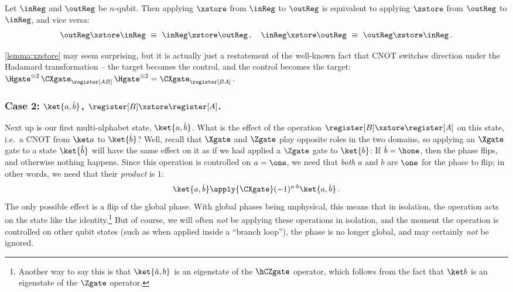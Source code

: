       \begin{lemma}\label{lemma:xzstore}
        Let $\inReg$ and $\outReg$ be $n$-qubit. Then
        applying $\xstore$ from $\inReg$ to $\outReg$ is equivalent to applying
        $\zstore$ from $\outReg$ to $\inReg$, and vice versa:
        \[
        \outReg \xstore \inReg\ \equiv\ \inReg \zstore \outReg\, ,
        \quad
        \inReg \xstore \outReg\ \equiv\ \outReg \zstore \inReg\, .
        \]
      \end{lemma}

      \cref{lemma:xzstore} may seem surprising, but it is
        actually just a restatement of the well-known fact that
        CNOT switches direction under the Hadamard transformation -- the target
        becomes the control, and the control becomes the target:
      $
        \Hgate^{\otimes 2}\, \CXgate_{\register[AB]}\, \Hgate^{\otimes 2} = \CXgate_{\register[BA]}\, .
      $

    \subsubsection{Case 2: $\ket{a, \hat b}$, $\register[B] \xstore \register[A]$.}
      Next up is our first multi-alphabet state,
        $\ket{a, \hat b}$. What is the effect of the operation 
        $\register[B] \xstore \register[A]$ on this state, 
        i.e.\ a CNOT from $\ket a$ to $\ket{\hat b}$?
        Well, recall that $\Xgate$ and $\Zgate$ play opposite roles in the
        two domains, so applying an $\Xgate$ gate to a state $\ket{\hat b}$
        will have the same effect on it as if we had applied a $\Zgate$ gate
        to $\ket{b}$: If $\hat b = \hone$, then the
        phase flips, and otherwise nothing happens.
        Since this operation is controlled on $a = \one$, we need that
        \emph{both} $a$ and $b$ are $\one$ for the phase to flip; in other
        words, we need that their \emph{product} is $1$:
      \[
        \ket{a, \hat b} \apply{\CXgate} (-1)^{a \cdot b}\ket{a,\hat b}\, .
      \]
      The only possible effect is a flip of the global phase.
        With global phases being unphysical, this means that
        in isolation, the operation acts on the state like the
        identity.\footnote{
          Another way to say this is that $\ket{\hat a, b}$ is an
          eigenstate of the $\hCZgate$ operator, which follows
          from the fact that $\ket b$ is an eigenstate of the $\Zgate$
          operator.
        }
        But of course, we will often \emph{not} be applying these operations in isolation, and
        the moment the operation is controlled on other qubit states (such as
        when applied inside a ``branch loop''), the phase
        is no longer global, and may certainly \emph{not} be ignored.

